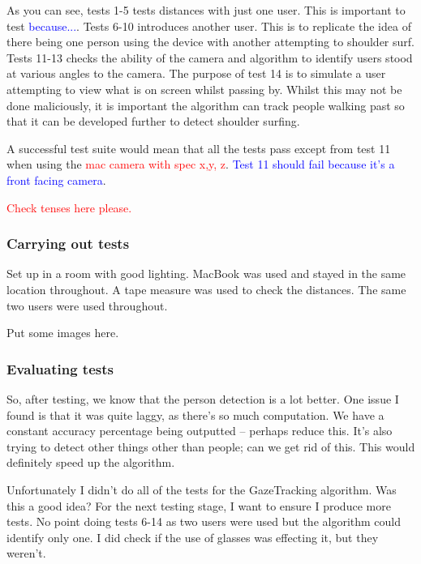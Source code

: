 \documentclass[12pt]{article}
\theoremstyle{plain}
\theoremstyle{definition}
\begin{document}
As you can see, tests 1-5 tests distances with just one user. This is important to test \textcolor{blue}{because...}.
Tests 6-10 introduces another user. This is to replicate the idea of there being one person using the device with another attempting to shoulder surf.
Tests 11-13 checks the ability of the camera and algorithm to identify users stood at various angles to the camera.
The purpose of test 14 is to simulate a user attempting to view what is on screen whilst passing by. Whilst this may not be done maliciously, it is important the algorithm can track people walking past so that it can be developed further to detect shoulder surfing.

A successful test suite would mean that all the tests pass except from test 11 when using the \textcolor{red}{mac camera with spec x,y, z}. \textcolor{blue}{Test 11 should fail because it's a front facing camera}.

\textcolor{red}{Check tenses here please.}

\subsubsection{Carrying out tests}

Set up in a room with good lighting. MacBook was used and stayed in the same location throughout. A tape measure was used to check the distances. The same two users were used throughout.

Put some images here. 

\subsubsection{Evaluating tests}

So, after testing, we know that the person detection is a lot better. One issue I found is that it was quite laggy, as there's so much computation. We have a constant accuracy percentage being outputted – perhaps reduce this. It’s also trying to detect other things other than people; can we get rid of this. This would definitely speed up the algorithm.

Unfortunately I didn't do all of the tests for the GazeTracking algorithm. Was this a good idea? For the next testing stage, I want to ensure I produce more tests. No point doing tests 6-14 as two users were used but the algorithm could identify only one. I did check if the use of glasses was effecting it, but they weren't.


\printbibliography

\clearpage\appendix
\end{document}
